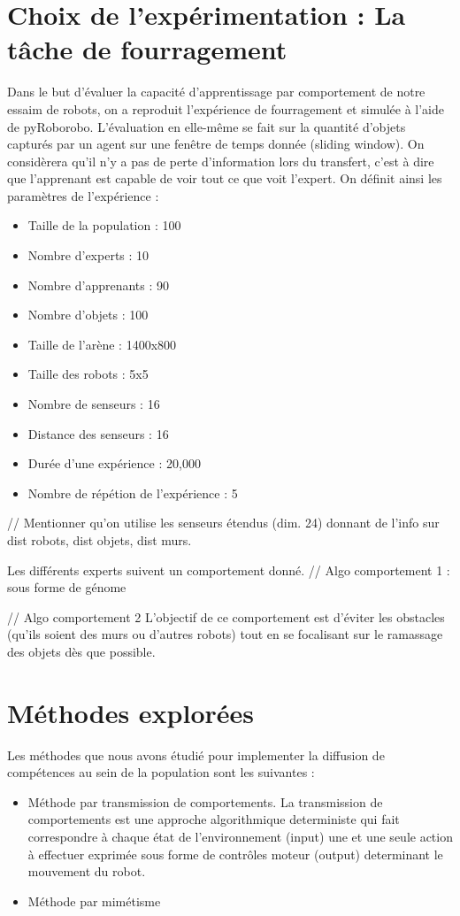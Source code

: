\documentclass[a4paper, 12pt]{report}
\begin{document}
    \section{Choix de l'expérimentation : La tâche de fourragement}
    Dans le but d'évaluer la capacité d'apprentissage par comportement de notre essaim de robots, on a reproduit l'expérience de fourragement et simulée à l'aide de pyRoborobo.
    L'évaluation en elle-même se fait sur la quantité d'objets capturés par un agent sur une fenêtre de temps donnée (sliding window). On considèrera qu'il n'y a pas de perte d'information lors du transfert, c'est à dire que l'apprenant est capable de voir tout ce que voit l'expert.
    On définit ainsi les paramètres de l'expérience :
    \begin{itemize}
    \item Taille de la population : 100
    \item Nombre d'experts : 10
    \item Nombre d'apprenants : 90
    \item Nombre d'objets : 100
    \item Taille de l'arène : 1400x800
    \item Taille des robots : 5x5
    \item Nombre de senseurs : 16
    \item Distance des senseurs : 16
    \item Durée d'une expérience : 20,000
    \item Nombre de répétion de l'expérience : 5
    \end{itemize}
    
// Mentionner qu'on utilise les senseurs étendus (dim. 24) donnant de l'info sur dist robots, dist objets, dist murs.

Les différents experts suivent un comportement donné.
// Algo comportement 1 : sous forme de génome

// Algo comportement 2
L'objectif de ce comportement est d'éviter les obstacles (qu'ils soient des murs ou d'autres robots) tout en se focalisant sur le ramassage des objets dès que possible.

	\section{Méthodes explorées}
	Les méthodes que nous avons étudié pour implementer la diffusion de compétences au sein de la population sont les suivantes :
	\begin{itemize}
	\item Méthode par transmission de comportements.  
	La transmission de comportements est une approche algorithmique deterministe qui fait correspondre à chaque état de l'environnement (input) une et une seule action à effectuer exprimée sous forme de contrôles moteur (output) determinant le mouvement du robot.
	
	\item Méthode par mimétisme
	\end{itemize}
	
\end{document}
